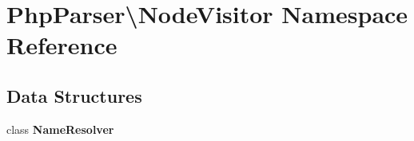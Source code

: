 \section{Php\+Parser\textbackslash{}Node\+Visitor Namespace Reference}
\label{namespace_php_parser_1_1_node_visitor}
\subsection*{Data Structures}
\begin{DoxyCompactItemize}
\item 
class {\bf Name\+Resolver}
\end{DoxyCompactItemize}
